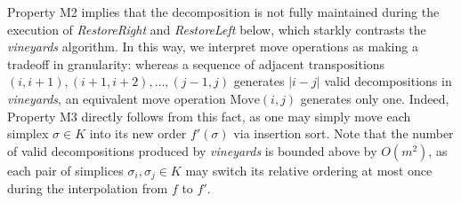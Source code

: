 \documentclass[sn-mathphys]{sn-jnl}
\begin{document}
Property M2 implies that the decomposition is not fully maintained during the execution of \textit{RestoreRight} and \textit{RestoreLeft} below, which starkly contrasts the \emph{vineyards} algorithm. 
In this way, we interpret move operations as making a tradeoff in granularity: whereas a sequence of adjacent transpositions $(i, i{+}1), (i{+}1, i{+}2), \dots, (j{-}1, j)$ generates $\lvert i - j \rvert $ valid decompositions in \emph{vineyards}, an equivalent move operation $\mathrm{Move}(i,j)$ generates only one.
Indeed, Property M3 directly follows from this fact, as one may simply move each simplex $\sigma \in K$ into its new order $f'(\sigma)$ via insertion sort. Note that the number of valid decompositions produced by \emph{vineyards} is bounded above by $O(m^2)$, as each pair of simplices $\sigma_i, \sigma_j \in K$ may switch its relative ordering at most once during the interpolation from $f$ to $f'$.
\end{document}
